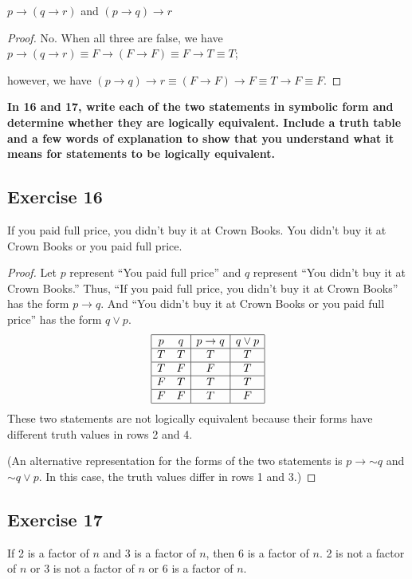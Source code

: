 \documentclass[14pt]{extarticle}
\begin{document}
$p \to (q \to r)$ and $(p \to q) \to r$

\begin{proof}
No. When all three are false, we have $p \to (q \to r) \equiv F \to (F \to F) \equiv F \to T \equiv T$;

however, we have $(p \to q) \to r \equiv (F \to F) \to F \equiv T \to F \equiv F$.
\end{proof}

{\bf In 16 and 17, write each of the two statements in symbolic form and determine whether they are logically equivalent. Include a truth table and a few words of explanation to show that you understand what it means for statements to be logically equivalent.}

\subsection{Exercise 16}
If you paid full price, you didn’t buy it at Crown Books. You didn’t buy it at Crown Books or you paid full price.

\begin{proof}
Let $p$ represent “You paid full price” and $q$ represent “You
didn’t buy it at Crown Books.” Thus, “If you paid full price, you didn’t buy it at Crown Books” has the form $p \to q$. And “You didn’t buy it at Crown Books or you paid full price” has the form $q \vee p$.
$$
\begin{array}{|cc|c|c|}
\hline
p & q & p \to q & q \vee p \\
\hline
T & T & T & T \\
\hline
T & F & F & T \\
\hline
F & T & T & T \\
\hline
F & F & T & F \\
\hline
\end{array}
$$
These two statements are not logically equivalent because their forms have different truth values in rows 2 and 4.

(An alternative representation for the forms of the two statements is $p \to {\sim q}$ and ${\sim q} \vee p$. In this case, the truth values differ in rows 1 and 3.)
\end{proof}

\subsection{Exercise 17}
If 2 is a factor of $n$ and 3 is a factor of $n$, then 6 is a factor of $n$. 2 is not a factor of $n$ or 3 is not a factor of $n$ or 6 is a factor of $n$.
\end{document}
